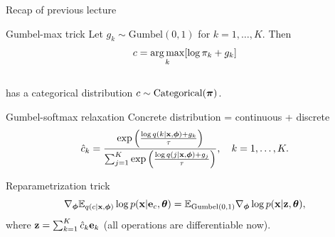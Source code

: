 \begin{frame}{Recap of previous lecture}
	\vspace{-0.4cm}
	\begin{block}{Gumbel-max trick}
		Let $g_k \sim \text{Gumbel}(0, 1)$ for $k = 1, \dots, K$. Then
		\vspace{-0.3cm}
		\[
			c = \operatorname*{arg\,max}_k [\log \pi_k + g_k]
		\]
		\vspace{-0.6cm} \\
		has a categorical distribution $c \sim \text{Categorical}(\boldsymbol{\pi})$.
	\end{block}
	\vspace{-0.2cm}
	\begin{block}{Gumbel-softmax relaxation}
		Concrete distribution = continuous + discrete
		\vspace{-0.2cm}
		\[
			\hat{c}_k = \frac{\exp \left(\frac{\log q(k | \mathbf{x}, \boldsymbol{\phi}) + g_k}{\tau}\right)}{\sum_{j=1}^K \exp \left(\frac{\log q(j | \mathbf{x}, \boldsymbol{\phi}) + g_j}{\tau}\right)}, \quad k = 1, \dots, K.
		\]
		\vspace{-0.7cm}
 	\end{block}
	\begin{block}{Reparametrization trick}
		\vspace{-0.4cm}
		\[
			\nabla_{\boldsymbol{\phi}} \mathbb{E}_{q(c | \mathbf{x}, \boldsymbol{\phi})} \log p(\mathbf{x} | \mathbf{e}_{c} , \boldsymbol{\theta}) = \mathbb{E}_{\text{Gumbel}(0, 1)} \nabla_{\boldsymbol{\phi}} \log p(\mathbf{x} | \mathbf{z} , \boldsymbol{\theta}),
		\]
		where $\mathbf{z} = \sum_{k=1}^K\hat{c}_k \mathbf{e}_k$ (all operations are differentiable now).
	\end{block}
 	\vspace{-0.2cm}
\end{frame}
